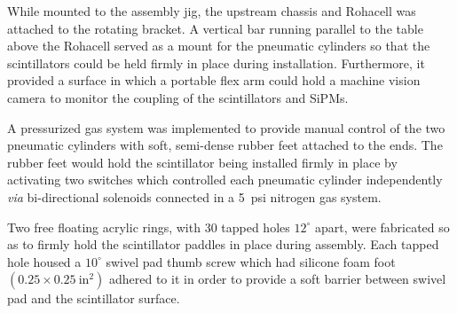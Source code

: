 While mounted to the assembly jig, the upstream chassis and Rohacell was attached to the rotating bracket.  A vertical bar running parallel to the table above the Rohacell served as a mount for the pneumatic cylinders so that the scintillators could be held firmly in place during installation.  Furthermore, it provided a surface in which a portable flex arm could hold a machine vision camera to monitor the coupling of the scintillators and SiPMs.

A pressurized gas system was implemented to provide manual control of the two pneumatic cylinders with soft, semi-dense rubber feet attached to the ends.  The rubber feet would hold the scintillator being installed firmly in place by activating two switches which controlled each pneumatic cylinder independently \textit{via} bi-directional solenoids connected in a 5~psi nitrogen gas system.

Two free floating acrylic rings, with 30 tapped holes $12^{\circ}$ apart, were fabricated so as to firmly hold the scintillator paddles in place during assembly. 
Each tapped hole housed a $10^{\circ}$ swivel pad thumb screw which had silicone foam foot $(0.25 \times 0.25\ \mathrm{in^{2}})$ adhered to it in order to provide a soft barrier between swivel pad and the scintillator surface. 

